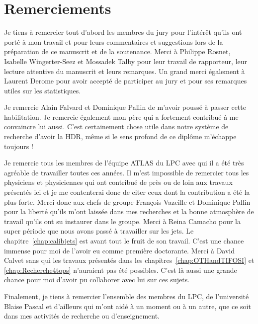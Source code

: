 
\chapter*{Remerciements}

Je tiens \`a remercier tout d'abord les membres du jury pour l'int\'er\^et qu'ils ont 
port\'e \`a mon travail et pour leurs commentaires et suggestions lors de la pr\'eparation 
de ce manuscrit et de la soutenance. Merci \`a Philippe Rosnet, Isabelle Wingerter-Seez et
Mossadek Talby 
pour leur travail de rapporteur, leur lecture attentive du manuscrit et leurs remarques. 
Un grand merci \'egalement \`a Laurent Derome pour avoir accept\'e de participer au jury et pour ses remarques 
utiles sur les statistiques. 

Je remercie Alain Falvard et Dominique Pallin de m'avoir pouss\'e \`a passer cette habilitation. 
Je remercie \'egalement mon p\`ere qui a fortement contribu\'e \`a me convaincre lui aussi. C'est 
certainement chose utile dans notre syst\`eme de recherche d'avoir la HDR, m\^eme si le sens profond 
de ce dipl\^ome m'\'echappe toujours ! 

Je remercie tous les membres de l'\'equipe ATLAS du LPC avec qui il a \'et\'e tr\`es agr\'eable de 
travailler toutes ces ann\'ees. Il m'est impossible de remercier tous les physiciens et physiciennes 
qui ont contribu\'e de pr\`es ou de loin aux travaux pr\'esent\'es ici et je 
me contenterai donc de citer ceux dont la contribution a \'et\'e la plus forte. Merci donc aux 
chefs de groupe Fran\c cois Vazeille et Dominique Pallin pour la libert\'e qu'ils m'ont laiss\'ee dans 
mes recherches et la bonne atmosph\`ere de travail qu'ils ont su instaurer dans le groupe. Merci \`a Reina 
Camacho pour la super p\'eriode que nous avons pass\'e \`a travailler sur les jets. Le 
chapitre~\ref{chap:calibjets} est avant tout le fruit de son travail. C'est une chance immense pour moi de 
l'avoir eu comme premi\`ere doctorante. Merci \`a David Calvet sans qui les travaux 
pr\'esent\'es dans les chapitres~\ref{chap:OTHandTIFOSI} et \ref{chap:Recherche4tops} n'auraient pas 
\'et\'e possibles. C'est l\`a aussi une grande chance pour moi d'avoir pu collaborer avec lui sur ces 
sujets.

Finalement, je tiens \`a remercier l'ensemble des membres du LPC, de l'universit\'e Blaise Pascal et 
d'ailleurs qui m'ont aid\'e \`a un moment ou \`a un autre, que ce soit dans mes activit\'es de recherche 
ou d'enseignement.  

